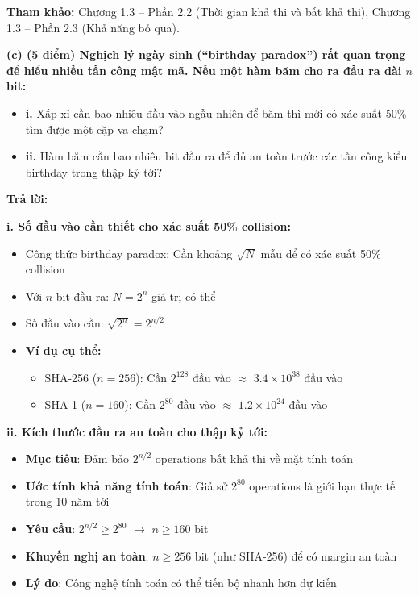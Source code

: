\textbf{Tham khảo:} Chương 1.3 – Phần 2.2 (Thời gian khả thi và bất khả thi), Chương 1.3 – Phần 2.3 (Khả năng bỏ qua).

\textbf{(c) (5 điểm) Nghịch lý ngày sinh (``birthday paradox'') rất quan trọng để hiểu nhiều tấn công mật mã. Nếu một hàm băm cho ra đầu ra dài $n$ bit:}

\begin{itemize}
    \item \textbf{i.} Xấp xỉ cần bao nhiêu đầu vào ngẫu nhiên để băm thì mới có xác suất 50\% tìm được một cặp va chạm?
    \item \textbf{ii.} Hàm băm cần bao nhiêu bit đầu ra để đủ an toàn trước các tấn công kiểu birthday trong thập kỷ tới?
\end{itemize}

\begin{center}
\textbf{Trả lời:}
\end{center}

\textbf{i. Số đầu vào cần thiết cho xác suất 50\% collision:}
\begin{itemize}
    \item Công thức birthday paradox: Cần khoảng $\sqrt{N}$ mẫu để có xác suất 50\% collision
    \item Với $n$ bit đầu ra: $N = 2^n$ giá trị có thể
    \item Số đầu vào cần: $\sqrt{2^n} = 2^{n/2}$
    \item \textbf{Ví dụ cụ thể:}
    \begin{itemize}
        \item SHA-256 ($n=256$): Cần $2^{128}$ đầu vào $\approx$ $3.4 \times 10^{38}$ đầu vào
        \item SHA-1 ($n=160$): Cần $2^{80}$ đầu vào $\approx$ $1.2 \times 10^{24}$ đầu vào
    \end{itemize}
\end{itemize}

\textbf{ii. Kích thước đầu ra an toàn cho thập kỷ tới:}
\begin{itemize}
    \item \textbf{Mục tiêu}: Đảm bảo $2^{n/2}$ operations bất khả thi về mặt tính toán
    \item \textbf{Ước tính khả năng tính toán}: Giả sử $2^{80}$ operations là giới hạn thực tế trong 10 năm tới
    \item \textbf{Yêu cầu}: $2^{n/2} \geq 2^{80}$ $\rightarrow$ $n \geq 160$ bit
    \item \textbf{Khuyến nghị an toàn}: $n \geq 256$ bit (như SHA-256) để có margin an toàn
    \item \textbf{Lý do}: Công nghệ tính toán có thể tiến bộ nhanh hơn dự kiến
\end{itemize}

